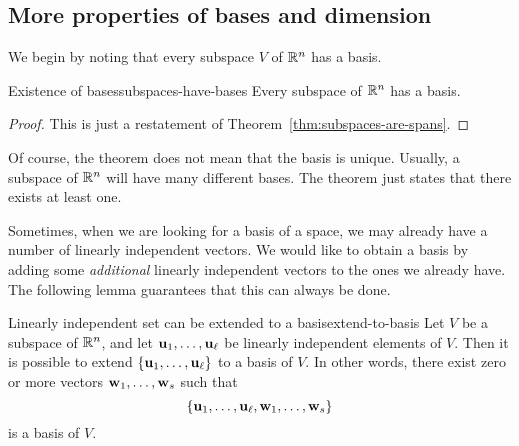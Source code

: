 \subsection{More properties of bases and dimension}

We begin by noting that every subspace $V$ of $\mathbb{R}^n$ has a basis.

\begin{theorem}{Existence of bases}{subspaces-have-bases}
  Every subspace of $\mathbb{R}^n$ has a basis. 
\end{theorem}

\begin{proof}
  This is just a restatement of Theorem~\ref{thm:subspaces-are-spans}.
\end{proof}

Of course, the theorem does not mean that the basis is
unique. Usually, a subspace of $\mathbb{R}^n$ will have many different
bases. The theorem just states that there exists at least one.

Sometimes, when we are looking for a basis of a space, we may already
have a number of linearly independent vectors. We would like to obtain
a basis by adding some {\em additional} linearly independent vectors
to the ones we already have. The following lemma guarantees that this
can always be done.

\begin{lemma}{Linearly independent set can be extended to a basis}{extend-to-basis}
  Let $V$ be a subspace of $\mathbb{R}^n$, and let
  $\mbox{\bf u}_1,\ldots,\mbox{\bf u}_{\ell}$ be linearly independent elements
  of $V$. Then it is possible to extend
  $\left\{\mbox{\bf u}_1,\ldots,\mbox{\bf u}_{\ell}\right\}$ to a basis of $V$. In other
  words, there exist zero or more vectors
  $\mbox{\bf w}_1,\ldots,\mbox{\bf w}_s$ such that
  \begin{equation*}
    \left\{\mbox{\bf u}_1,\ldots,\mbox{\bf u}_{\ell},\mbox{\bf w}_1,\ldots,\mbox{\bf w}_s\right\}
  \end{equation*}
  is a basis of $V$.
\end{lemma}

